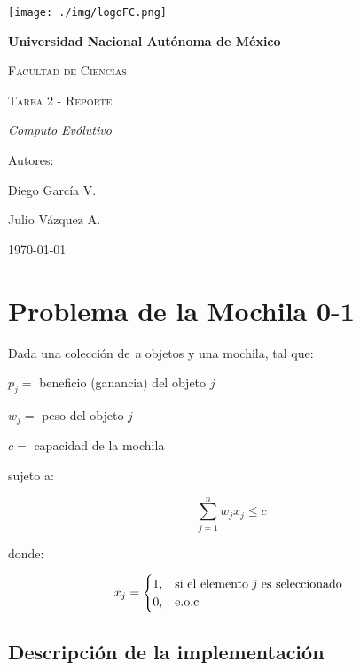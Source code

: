 \documentclass{article}
\begin{document}
\begin{titlepage}
{\texttt{[image: ./img/logoFC.png]}\par}
\vspace{1cm}
\centering
{\bfseries\huge Universidad Nacional Autónoma de México \par}
\vspace{1cm}
{\scshape\huge Facultad de Ciencias \par}
\vspace{2cm}
{\scshape\Huge Tarea 2 - Reporte\par}
\vspace{2cm}
{\itshape\LARGE Computo Evólutivo \par}
\vfill
{\large Autores: \par}
{\large Diego García V. \par}
{\large Julio Vázquez A. \par}
\vfill
{\Large \today \par}
\end{titlepage}

\section*{Problema de la Mochila 0-1 }
Dada una colección de \textit{n} objetos y una mochila, tal que:

\begin{center}
$p_j = $ beneficio (ganancia) del objeto $j$

$w_j = $ peso del objeto $j$

$c = $ capacidad de la mochila
\end{center}

sujeto a:

\begin{equation*}
\sum_{j=1}^n w_{j}x_{j} \leq c
\end{equation*}

donde:


\begin{equation*}
 x_{j}=
\begin{cases}
1, & \text{si el elemento \textit{j} es seleccionado }\\
0,& \text{e.o.c }
\end{cases}
\end{equation*}




\subsection*{Descripción de la implementación}
\end{document}
